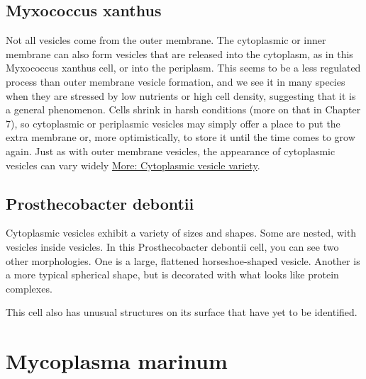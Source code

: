 \documentclass[]{tufte-book}
\begin{document}
\hypertarget{htmlwidget-e6642f449d4fdd590667}{}

\hypertarget{Inner_membrane_vesicles}{%
\subsection{Myxococcus xanthus}\label{Inner_membrane_vesicles}}

Not all vesicles come from the outer membrane. The cytoplasmic or inner membrane can also form vesicles that are released into the cytoplasm, as in this Myxococcus xanthus cell, or into the periplasm. This seems to be a less regulated process than outer membrane vesicle formation, and we see it in many species when they are stressed by low nutrients or high cell density, suggesting that it is a general phenomenon. Cells shrink in harsh conditions (more on that in Chapter 7), so cytoplasmic or periplasmic vesicles may simply offer a place to put the extra membrane or, more optimistically, to store it until the time comes to grow again. Just as with outer membrane vesicles, the appearance of cytoplasmic vesicles can vary widely \protect\hyperlink{Cytoplasmic_vesicle_variety}{More: Cytoplasmic vesicle variety}.

\hypertarget{htmlwidget-a0bada01c44a4b3aa116}{}

\hypertarget{Cytoplasmic_vesicle_variety}{%
\subsection{Prosthecobacter debontii}\label{Cytoplasmic_vesicle_variety}}

Cytoplasmic vesicles exhibit a variety of sizes and shapes. Some are nested, with vesicles inside vesicles. In this Prosthecobacter debontii cell, you can see two other morphologies. One is a large, flattened horseshoe-shaped vesicle. Another is a more typical spherical shape, but is decorated with what looks like protein complexes.

This cell also has unusual structures on its surface that have yet to be identified.

\hypertarget{htmlwidget-aacef73f85dca779d95a}{}

\hypertarget{mycoplasma-marinum}{%
\section{Mycoplasma marinum}\label{mycoplasma-marinum}}
\end{document}
